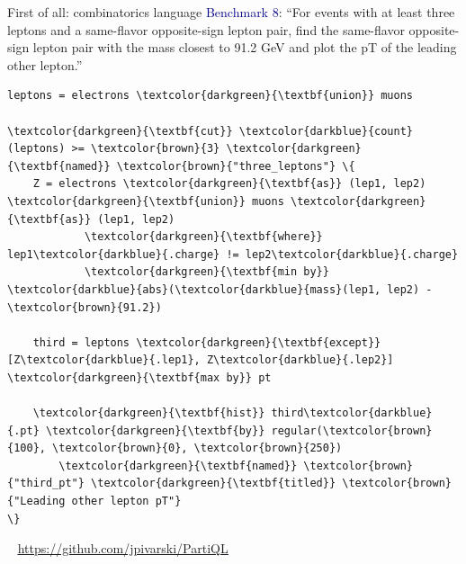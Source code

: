 \documentclass[aspectratio=169]{beamer}
\begin{document}
\begin{frame}[fragile]{First of all: combinatorics language}
\vspace{0.3 cm}
\textcolor{darkblue}{Benchmark 8}: ``For events with at least three leptons and a same-flavor opposite-sign lepton pair, find the same-flavor opposite-sign lepton pair with the mass closest to 91.2 GeV and plot the pT of the leading other lepton.''

\small
\vspace{0.2 cm}
\begin{Verbatim}[commandchars=\\\{\}]
leptons = electrons \textcolor{darkgreen}{\textbf{union}} muons

\textcolor{darkgreen}{\textbf{cut}} \textcolor{darkblue}{count}(leptons) >= \textcolor{brown}{3} \textcolor{darkgreen}{\textbf{named}} \textcolor{brown}{"three_leptons"} \{
    Z = electrons \textcolor{darkgreen}{\textbf{as}} (lep1, lep2) \textcolor{darkgreen}{\textbf{union}} muons \textcolor{darkgreen}{\textbf{as}} (lep1, lep2)
            \textcolor{darkgreen}{\textbf{where}} lep1\textcolor{darkblue}{.charge} != lep2\textcolor{darkblue}{.charge}
            \textcolor{darkgreen}{\textbf{min by}} \textcolor{darkblue}{abs}(\textcolor{darkblue}{mass}(lep1, lep2) - \textcolor{brown}{91.2})

    third = leptons \textcolor{darkgreen}{\textbf{except}} [Z\textcolor{darkblue}{.lep1}, Z\textcolor{darkblue}{.lep2}] \textcolor{darkgreen}{\textbf{max by}} pt

    \textcolor{darkgreen}{\textbf{hist}} third\textcolor{darkblue}{.pt} \textcolor{darkgreen}{\textbf{by}} regular(\textcolor{brown}{100}, \textcolor{brown}{0}, \textcolor{brown}{250})
        \textcolor{darkgreen}{\textbf{named}} \textcolor{brown}{"third_pt"} \textcolor{darkgreen}{\textbf{titled}} \textcolor{brown}{"Leading other lepton pT"}
\}
\end{Verbatim}

\vspace{-0.1 cm}
\mbox{ } \hfill \textcolor{blue}{\underline{\url{https://github.com/jpivarski/PartiQL}}} \hfill \mbox{ }
\end{frame}
\end{document}
